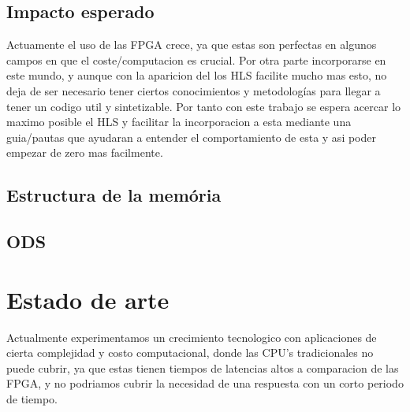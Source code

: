 \documentclass[11pt,spanish,listoffigures,listoftables]{tfgetsinf}
\begin{document}
\section{Impacto esperado}

   Actuamente el uso de las FPGA crece, ya que estas son perfectas en algunos
   campos en que el coste/computacion es crucial. Por otra parte incorporarse en
   este mundo, y aunque con la aparicion del los HLS facilite mucho mas esto, no
   deja de ser necesario tener ciertos conocimientos y metodologías para llegar
   a tener un codigo util y sintetizable.  Por tanto con este trabajo se espera
   acercar lo maximo posible el HLS y facilitar la incorporacion a esta mediante
   una guia/pautas que ayudaran a entender el comportamiento de esta y asi poder
   empezar de zero mas facilmente.

\section{Estructura de la mem\'oria}

\section{ODS}




\chapter{Estado de arte}

   Actualmente experimentamos un crecimiento tecnologico con aplicaciones de
   cierta complejidad y costo computacional, donde las CPU's tradicionales no
   puede cubrir, ya que estas tienen tiempos de latencias altos a comparacion de
   las FPGA, y no podriamos cubrir la necesidad de una respuesta con un corto
   periodo de tiempo.
   
\end{document}
